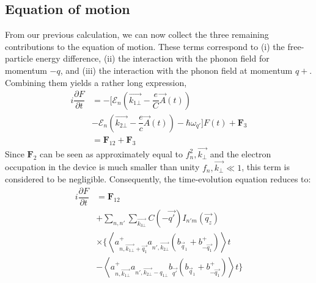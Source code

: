 \documentclass[%
 reprint,
 amsmath,amssymb,
 aps,
]{revtex4-2}
\begin{document}
\subsection{Equation of motion}
From our previous calculation, we can now collect the three remaining contributions to the equation of motion. These terms correspond to (i) the free-particle energy difference, (ii) the interaction with the phonon field for momentum $-q$, and (iii) the interaction with the phonon field at momentum $q+$. Combining them yields a rather long expression, 
\begin{equation}
    \begin{split}
    i \dfrac{\partial F}{\partial t} 
    &= -\Big[\mathcal{E}_{n} \left(\vec{k_{1\bot}} - \dfrac{e}{C} \vec{A} (t) \right) \\
    & - \mathcal{E}_{n} \left(\vec{k_{2\bot}}-\dfrac{e}{c} \vec{A}(t) \right)- \hbar \omega_{q'}\Big] F(t) + \mathbf{F}_{3} \\
    & = \mathbf{F}_{12} + \mathbf{F}_{3}
    \end{split}
\end{equation}
Since $\mathbf{F}_{2}$ can be seen as approximately equal to $f^2_n, \vec{k_\bot}$ and the electron occupation in the device is much smaller than unity $f_n,\vec{k_\bot} \ll 1$, this term is considered to be negligible. Consequently, the time-evolution equation reduces to:
\begin{equation}\label{eq:qq1}
    \begin{split}
        i \dfrac{\partial F}{\partial t} 
        & = \mathbf{F}_{12} \\
        & + \sum_{n,n'} \sum_{\vec{k_{3\bot}}} C \left(-\vec{q'}\right) I_{n'm}\left(\vec{q_z}\right) \\
        &\times \Big\{\left\langle a^+_{n, \vec{k_{1\bot}} + \vec{q_{1}}} a_{n', \vec{k_{2\bot}}}\left(b_{\vec{q}_1}+ b^+_{- \vec{q_1}}\right)\right\rangle t  \\
        & - \left \langle a^+_{n, \vec{k_{1\bot}}} a_{n', \vec{k_{2\bot}}- q_{1\bot}}b_{\vec{q'}} \left(b_{\vec{q}_1}+ b^+_{-\vec{q_1}}\right)\right \rangle t \Big\}
    \end{split}
\end{equation}
\end{document}
